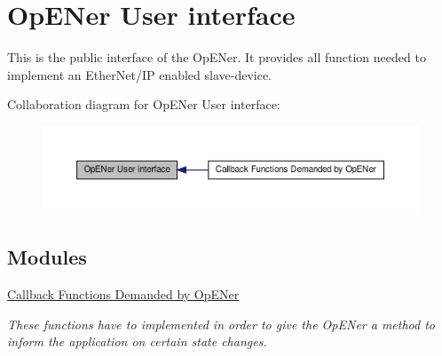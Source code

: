 \hypertarget{group__CIP__API}{\section{\-Op\-E\-Ner \-User interface}
\label{d2/dc9/group__CIP__API}
}


\-This is the public interface of the \-Op\-E\-Ner. \-It provides all function needed to implement an \-Ether\-Net/\-I\-P enabled slave-\/device.  


\-Collaboration diagram for \-Op\-E\-Ner \-User interface\-:
\nopagebreak
\begin{figure}[H]
\begin{center}
\leavevmode
\includegraphics[width=350pt]{d2/dc9/group__CIP__API}
\end{center}
\end{figure}
\subsection*{\-Modules}
\begin{DoxyCompactItemize}
\item 
\hyperlink{group__CIP__CALLBACK__API}{\-Callback Functions Demanded by Op\-E\-Ner}
\begin{DoxyCompactList}\small\item\em \-These functions have to implemented in order to give the \-Op\-E\-Ner a method to inform the application on certain state changes. \end{DoxyCompactList}\end{DoxyCompactItemize}
